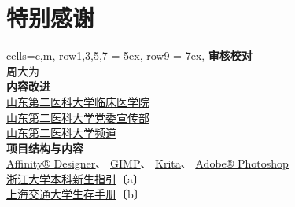 \chapter*{特别感谢}
\vspace{-2ex}
\begin{table}[H]
    \centering
    \begin{tblr}[
            tall,
            theme = {no-caption},
            note{1} = {符号含义：\newline〔a〕:已获编委（主编）授权；〔b〕：已询问，暂未答复；〔c〕：未能联系到作者。},
        ]{
            cells={c,m},
            row{1,3,5,7} = {5ex},
            row{9} = {7ex},
        }
        {\large\textbf{审核校对}}                                                                 \\
        {周大为}                                                                                  \\
        {\large\textbf{内容改进}}                                                                 \\
        {
        \uline{\href{https://xchb.sdsmu.edu.cn}{山东第二医科大学临床医学院}}                      \\
        \uline{\href{https://xchb.sdsmu.edu.cn}{山东第二医科大学党委宣传部}}                      \\
        \uline{\href{https://pd.qq.com/s/7mekdr5ve}{山东第二医科大学频道}}
        }                                                                                         \\
        {\large\textbf{项目结构与内容}}                                               \\
        {
        \uline{\href{https://affinity.serif.com/zh-cn/designer}{Affinity® Designer}}、%
        \uline{\href{https://www.gimp.org/}{GIMP}}、%
        \uline{\href{https://krita.org/zh-cn}{Krita}}、%
        \uline{\href{https://www.adobe.com/cn/creativecloud/roc/business.html}{Adobe® Photoshop}} \\
        \uline{\href{https://zjuers.com/welcome}{%
        浙江大学本科新生指引}}〔a〕                                                               \\
        \uline{\href{https://github.com/SurviveSJTU/SurviveSJTUManual}{%
        上海交通大学生存手册}}〔b〕                                                               \\
        \uline{\href{https://github.com/SUSTech-Application/SUSTechapplication}{%
}}}
\end{tblr}
\end{table}
